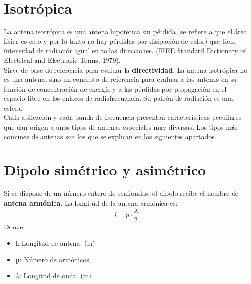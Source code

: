 \documentclass[
	12pt, %
	fleqn, %
	a4paper, %
	oneside, %
]{LegrandOrangeBook}
\begin{document}
\section{Isotrópica}
La antena isotrópica es una antena hipotética sin pérdida (se refiere a que el área física es cero y por lo tanto no hay pérdidas por disipación de calor) que tiene intensidad de radiación igual en todas direcciones. (IEEE Standard Dictionary of Electrical and Electronic Terms, 1979). \\
Sirve de base de referencia para evaluar la \textbf{directividad}. La antena isotrópica no es una antena, sino un concepto de referencia para evaluar a las antenas en su función de concentración de energía y a las pérdidas por propagación en el espacio libre en los enlaces de radiofrecuencia. Su patrón de radiación es una esfera.\\
Cada aplicación y cada banda de frecuencia presentan características peculiares que dan origen a
unos tipos de antenas especiales muy diversas. Los tipos más comunes de antenas son los que se
explican en los siguientes apartados.
\section{Dipolo simétrico y asimétrico}
\begin{definition}
Si se dispone de un número entero de semiondas, el dipolo recibe el nombre de \textbf{antena armónica}. La longitud de la antena armónica es:
\begin{equation}
l=p\cdot \frac{\lambda}{2}
\label{eq:long ant armo}
\end{equation}
Donde:
\begin{itemize}
\item \textbf{l}: Longitud de antena. (m)
\item \textbf{p}: Número de armónicos.
\item $\lambda$: Longitud de onda. (m)
\end{itemize}
\end{definition}
\end{document}
